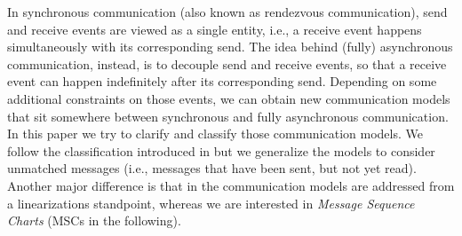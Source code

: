 


In synchronous communication (also known as rendezvous communication), send and receive events are  viewed as a single entity, i.e., a receive event  happens simultaneously with its corresponding send. The  idea behind (fully) asynchronous communication, instead, is to decouple send and receive events, so that a receive event can happen indefinitely after its corresponding send. Depending on some additional constraints on those events, we can obtain new communication models that sit somewhere between synchronous and fully asynchronous communication.
In this paper we try to clarify and classify those communication models. We follow the classification introduced in \cite{DBLP:journals/fac/ChevrouHQ16} but we generalize the models to  consider unmatched messages (i.e., messages that have been sent, but not yet read). Another major difference is that in \cite{DBLP:journals/fac/ChevrouHQ16} the communication models are addressed from a linearizations standpoint, whereas we are interested in \emph{Message Sequence Charts} (MSCs in the following). 
